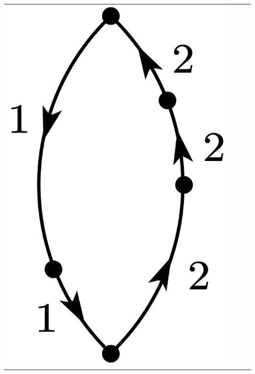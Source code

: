 \documentclass[a4paper]{book}
\newcounter{solution}[chapter]
\begin{document}
\begin{solution}
\begin{center}
\begin{tabular}{cccc}
		\begin{minipage}{0.22\linewidth}
		\centering
		\includegraphics[scale=1.0,trim=0 -4 0 -4]{./pictures/6.01/6.png}
		\captionof*{figure}{$\displaystyle (-1)^{2+1} \frac{ V_{11} V_{12} V_{21} V^2_{22} }{ ( E^{(0)}_1 - E^{(0)}_2)^4 }$}
		\end{minipage} &
		

\end{tabular}
\end{center}
\end{solution}
\end{document}
